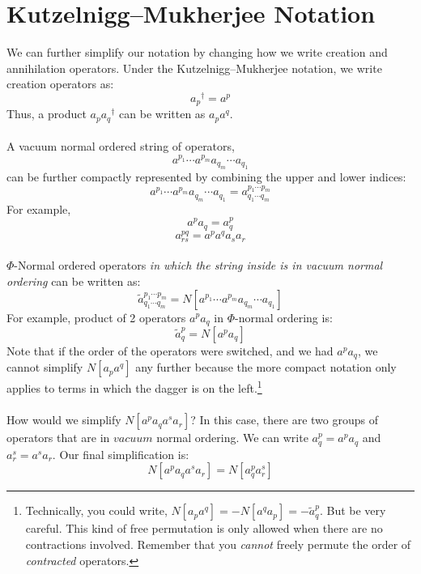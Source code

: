 \documentclass{article}
\newcommand{\dg}{\ensuremath{^\dagger} }
\newcommand{\cd}{\ensuremath{\cdots} }
\begin{document}
\section{Kutzelnigg--Mukherjee Notation}
We can further simplify our notation by changing how we write creation and annihilation operators.
Under the Kutzelnigg--Mukherjee notation, we write creation operators as: 
\[a_p\dg = a^p\]
Thus, a product $a_p a_q\dg$ can be written as $a_p a^q$. 
\\ \\
A vacuum normal ordered string of operators, 
\[a^{p_1} \cd a^{p_m} a_{q_m} \cd a_{q_1} \] 
can be further compactly represented by combining the upper and lower indices: 
\[a^{p_1} \cd a^{p_m} a_{q_m} \cd a_{q_1} = a^{p_1 \cd p_m}_{q_1 \cd q_m} \] 
For example, 
\[a^p a_q = a^p_q\]
\[a^{pq}_{rs} = a^pa^qa_sa_r\]
\\ 
$\Phi$-Normal ordered operators \textit{in which the string inside is in vacuum normal ordering }can be written as: 
\[ \tilde{a}^{p_1 \cd p_m}_{q_1 \cd q_m}  = N[ a^{p_1} \cd a^{p_m} a_{q_m} \cd a_{q_1}  ] \]
For example, product of 2 operators $a^pa_q$ in $\Phi$-normal ordering is: 
\[\tilde{a}^p_q = N[a^pa_q]\]
Note that if the order of the operators were switched, and we had $a^pa_q$, we cannot simplify $N[a_p a^q]$ any further because the more compact notation only applies to terms in which 
the dagger is on the left.\footnote{Technically, you could write, $N[a_p a^q] = - N[ a^q a_p] = - \tilde{a}^p_q$. But be very careful. 
This kind of free permutation is only allowed when there are no contractions involved. 
Remember that you \textit{cannot} freely permute the order of \textit{contracted} operators. } 
\\ \\ 
How would we simplify $N[a^p a_q a^s a_r ] $? In this case, there are two groups of operators that are in $vacuum$ normal ordering. 
We can write $a_q^p = a^p a_q$ and $a_r^s = a^s a_r$. 
Our final simplification is: 
\[N[a^p a_q a^s a_r ] = N[ a_q^p a_r^s ] \] 
 
\end{document}
